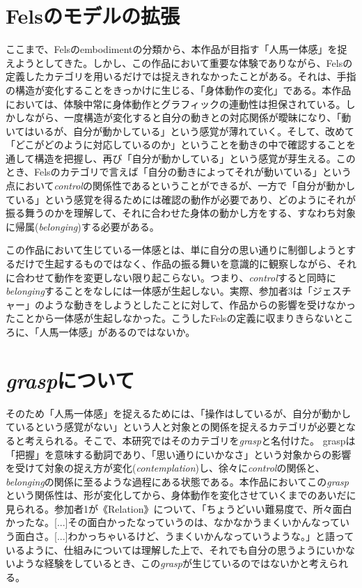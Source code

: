 \section{Felsのモデルの拡張}
ここまで、Felsのembodimentの分類から、本作品が目指す「人馬一体感」を捉えようとしてきた。しかし、この作品において重要な体験でありながら、Felsの定義したカテゴリを用いるだけでは捉えきれなかったことがある。それは、手指の構造が変化することをきっかけに生じる、「身体動作の変化」である。本作品においては、体験中常に身体動作とグラフィックの連動性は担保されている。しかしながら、一度構造が変化すると自分の動きとの対応関係が曖昧になり、「動いてはいるが、自分が動かしている」という感覚が薄れていく。そして、改めて「どこがどのように対応しているのか」ということを動きの中で確認することを通して構造を把握し、再び「自分が動かしている」という感覚が芽生える。このとき、Felsのカテゴリで言えば「自分の動きによってそれが動いている」という点において\textit{control}の関係性であるということができるが、一方で「自分が動かしている」という感覚を得るためには確認の動作が必要であり、どのようにそれが振る舞うのかを理解して、それに合わせた身体の動かし方をする、すなわち対象に帰属(\textit{belonging})する必要がある。

この作品において生じている一体感とは、単に自分の思い通りに制御しようとするだけで生起するものではなく、作品の振る舞いを意識的に観察しながら、それに合わせて動作を変更しない限り起こらない。つまり、\textit{control}すると同時に\textit{belonging}することをなしには一体感が生起しない。実際、参加者3は「ジェスチャー」のような動きをしようとしたことに対して、作品からの影響を受けなかったことから一体感が生起しなかった。こうしたFelsの定義に収まりきらないところに、「人馬一体感」があるのではないか。

\section{\textit{grasp}について}
そのため「人馬一体感」を捉えるためには、「操作はしているが、自分が動かしているという感覚がない」という人と対象との関係を捉えるカテゴリが必要となると考えられる。そこで、本研究ではそのカテゴリを\textit{grasp}と名付けた。
graspは「把握」を意味する動詞であり、「思い通りにいかなさ」という対象からの影響を受けて対象の捉え方が変化(\textit{contemplation})し、徐々に\textit{control}の関係と、\textit{belonging}の関係に至るような過程にある状態である。本作品においてこの\textit{grasp}という関係性は、形が変化してから、身体動作を変化させていくまでのあいだに見られる。参加者1が《Relation》について、「ちょうどいい難易度で、所々面白かったな。[...]その面白かったなっていうのは、なかなかうまくいかんなっていう面白さ。[...]わかっちゃいるけど、うまくいかんなっていうような。」と語っているように、仕組みについては理解した上で、それでも自分の思うようにいかないような経験をしているとき、この\textit{grasp}が生じているのではないかと考えられる。

